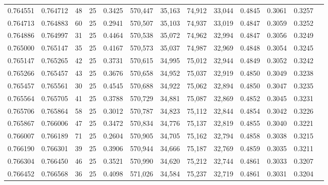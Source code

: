 \begin{tabular}{rrrrrrrrrrrrr}
0.764551 & 0.764712 &    48 &  25 &                                     0.3425 & 570,447 &  35,163 &  74,912 &  33,044 & 0.4845 & 0.3061 & 0.3257 \\
0.764713 & 0.764883 &    60 &  25 &                                     0.2941 & 570,507 &  35,103 &  74,937 &  33,019 & 0.4847 & 0.3059 & 0.3252 \\
0.764886 & 0.764997 &    31 &  25 &                                     0.4464 & 570,538 &  35,072 &  74,962 &  32,994 & 0.4847 & 0.3056 & 0.3249 \\
0.765000 & 0.765147 &    35 &  25 &                                     0.4167 & 570,573 &  35,037 &  74,987 &  32,969 & 0.4848 & 0.3054 & 0.3245 \\
0.765147 & 0.765265 &    42 &  25 &                                     0.3731 & 570,615 &  34,995 &  75,012 &  32,944 & 0.4849 & 0.3052 & 0.3242 \\
0.765266 & 0.765457 &    43 &  25 &                                     0.3676 & 570,658 &  34,952 &  75,037 &  32,919 & 0.4850 & 0.3049 & 0.3238 \\
0.765457 & 0.765561 &    30 &  25 &                                     0.4545 & 570,688 &  34,922 &  75,062 &  32,894 & 0.4850 & 0.3047 & 0.3235 \\
0.765564 & 0.765705 &    41 &  25 &                                     0.3788 & 570,729 &  34,881 &  75,087 &  32,869 & 0.4852 & 0.3045 & 0.3231 \\
0.765706 & 0.765864 &    58 &  25 &                                     0.3012 & 570,787 &  34,823 &  75,112 &  32,844 & 0.4854 & 0.3042 & 0.3226 \\
0.765867 & 0.766006 &    47 &  25 &                                     0.3472 & 570,834 &  34,776 &  75,137 &  32,819 & 0.4855 & 0.3040 & 0.3221 \\
0.766007 & 0.766189 &    71 &  25 &                                     0.2604 & 570,905 &  34,705 &  75,162 &  32,794 & 0.4858 & 0.3038 & 0.3215 \\
0.766190 & 0.766301 &    39 &  25 &                                     0.3906 & 570,944 &  34,666 &  75,187 &  32,769 & 0.4859 & 0.3035 & 0.3211 \\
0.766304 & 0.766450 &    46 &  25 &                                     0.3521 & 570,990 &  34,620 &  75,212 &  32,744 & 0.4861 & 0.3033 & 0.3207 \\
0.766452 & 0.766568 &    36 &  25 &                                     0.4098 & 571,026 &  34,584 &  75,237 &  32,719 & 0.4861 & 0.3031 & 0.3204 \\

\end{tabular}
